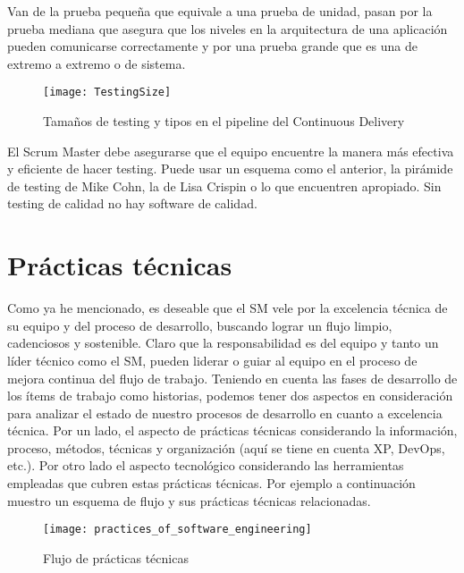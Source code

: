 Van de la prueba pequeña que equivale a una prueba de unidad, pasan por la prueba mediana que asegura que los niveles en la arquitectura de una aplicación pueden comunicarse correctamente y por una prueba grande que es una de extremo a extremo o de sistema.

\begin{figure}[h]
  \centering
  \texttt{[image: TestingSize]}
  \caption{Tamaños de testing y tipos en el pipeline del Continuous Delivery}
  \centering
  \label{fig:TestingSize} %
\end{figure}
\FloatBarrier %


El Scrum Master debe asegurarse que el equipo encuentre la manera más efectiva y eficiente de hacer testing. Puede usar un esquema como el anterior, la pirámide de testing de Mike Cohn, la de Lisa Crispin o lo que encuentren apropiado. Sin testing de calidad no hay software de calidad.

\section{Prácticas técnicas}

Como ya he mencionado, es deseable que el SM vele por la excelencia técnica de su equipo y del proceso de desarrollo, buscando lograr un flujo limpio, cadenciosos y sostenible. Claro que la responsabilidad es del equipo y tanto un líder técnico como el SM, pueden liderar o guiar al equipo en el proceso de mejora continua del flujo de trabajo. Teniendo en cuenta las fases de desarrollo de los ítems de trabajo como historias, podemos tener dos aspectos en consideración para analizar el estado de nuestro procesos de desarrollo en cuanto a excelencia técnica. Por un lado, el aspecto de prácticas técnicas considerando la información, proceso, métodos, técnicas y organización (aquí se tiene en cuenta XP, DevOps, etc.). Por otro lado el aspecto tecnológico considerando las herramientas empleadas que cubren estas prácticas técnicas. Por ejemplo a continuación muestro un esquema de flujo y sus prácticas técnicas relacionadas.

\begin{figure}[h]
  \centering
  \texttt{[image: practices\_of\_software\_engineering]}
  \caption{Flujo de prácticas técnicas}
  \centering
  \label{fig:practices_of_software_engineering} %
\end{figure}
\FloatBarrier %


